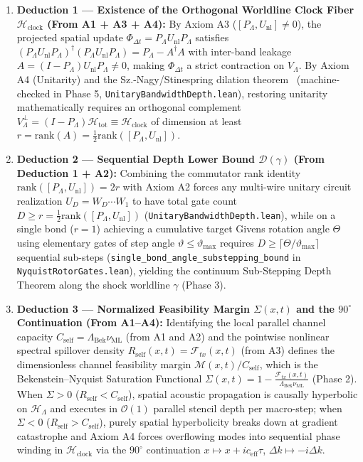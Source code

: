 \documentclass[11pt,a4paper]{article}
\theoremstyle{definition}
\begin{document}
\begin{enumerate}
\item \textbf{Deduction 1 --- Existence of the Orthogonal Worldline Clock Fiber $\mathcal{H}_{\text{clock}}$ (From A1 + A3 + A4):} By Axiom A3 ($[P_{\Lambda}, U_{\text{nl}}] \ne 0$), the projected spatial update $\Phi_{\Delta t} = P_{\Lambda} U_{\text{nl}} P_{\Lambda}$ satisfies $(P_{\Lambda} U_{\text{nl}} P_{\Lambda})^\dagger (P_{\Lambda} U_{\text{nl}} P_{\Lambda}) = P_{\Lambda} - A^\dagger A$ with inter-band leakage $A = (I - P_{\Lambda}) U_{\text{nl}} P_{\Lambda} \ne 0$, making $\Phi_{\Delta t}$ a strict contraction on $V_{\Lambda}$. By Axiom A4 (Unitarity) and the Sz.-Nagy/Stinespring dilation theorem~\cite{sznagy1953,stinespring1955} (machine-checked in Phase 5, \texttt{Unitary\allowbreak{}Bandwidth\allowbreak{}Depth.lean}), restoring unitarity mathematically requires an orthogonal complement $V_{\Lambda}^{\perp} = (I - P_{\Lambda})\mathcal{H}_{\text{tot}} \equiv \mathcal{H}_{\text{clock}}$ of dimension at least $r = \mathrm{rank}(A) = \frac{1}{2}\mathrm{rank}([P_{\Lambda}, U_{\text{nl}}])$.
\item \textbf{Deduction 2 --- Sequential Depth Lower Bound $\mathcal{D}(\gamma)$ (From Deduction 1 + A2):} Combining the commutator rank identity $\mathrm{rank}([P_{\Lambda}, U_{\text{nl}}]) = 2r$ with Axiom A2 forces any multi-wire unitary circuit realization $U_D = W_D \cdots W_1$ to have total gate count $D \ge r = \frac{1}{2}\mathrm{rank}([P_{\Lambda}, U_{\text{nl}} ])$ (\texttt{Unitary\allowbreak{}Bandwidth\allowbreak{}Depth.lean}), while on a single bond ($r = 1$) achieving a cumulative target Givens rotation angle $\Theta$ using elementary gates of step angle $\vartheta \le \vartheta_{\max}$ requires $D \ge \lceil \Theta / \vartheta_{\max} \rceil$ sequential sub-steps (\texttt{single\_\allowbreak{}bond\_\allowbreak{}angle\_\allowbreak{}substepping\_\allowbreak{}bound} in \texttt{Nyquist\allowbreak{}Rotor\allowbreak{}Gates.lean}), yielding the continuum Sub-Stepping Depth Theorem along the shock worldline $\gamma$ (Phase 3).
\item \textbf{Deduction 3 --- Normalized Feasibility Margin $\Sigma(x,t)$ and the $90^\circ$ Continuation (From A1--A4):} Identifying the local parallel channel capacity $C_{\text{self}} = \Lambda_{\text{Bek}}\nu_{\text{ML}}$ (from A1 and A2) and the pointwise nonlinear spectral spillover density $R_{\text{self}}(x,t) = \mathcal{F}_{tx}(x,t)$ (from A3) defines the dimensionless channel feasibility margin $\mathcal{M}(x,t)/C_{\text{self}}$, which is the Bekenstein--Nyquist Saturation Functional $\Sigma(x,t) = 1 - \frac{\mathcal{F}_{tx}(x,t)}{\Lambda_{\text{Bek}}\nu_{\text{ML}}}$ (Phase 2). When $\Sigma > 0$ ($R_{\text{self}} < C_{\text{self}}$), spatial acoustic propagation is causally hyperbolic on $\mathcal{H}_{\Lambda}$ and executes in $\mathcal{O}(1)$ parallel stencil depth per macro-step; when $\Sigma < 0$ ($R_{\text{self}} > C_{\text{self}}$), purely spatial hyperbolicity breaks down at gradient catastrophe and Axiom A4 forces overflowing modes into sequential phase winding in $\mathcal{H}_{\text{clock}}$ via the $90^\circ$ continuation $x \mapsto x + i c_{\text{eff}}\tau$, $\Delta k \mapsto -i\Delta k$.

\end{enumerate}
\end{document}
